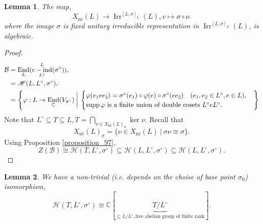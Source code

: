 \documentclass[8pt]{article}
\newtheorem{lemma}{Lemma}[section]
\DeclareMathOperator{\cind}{c-ind}
\DeclareMathOperator{\End}{End}
\DeclareMathOperator{\supp}{supp}
\DeclareMathOperator{\Irr}{Irr}
\DeclareMathOperator{\nr}{nr}
\newcommand{\C}[0]{\mathbb{C}}
\newcommand{\sep}[0]{\:|\:}
\newcommand{\hecke}[0]{\mathscr{H}}
\newcommand{\cB}{\mathcal{B}}
\begin{document}
\begin{lemma}
  \label{lemma_108}
  The map,
  \begin{equation*}
    X_{\nr}(L)\to\Irr^{[L,\sigma]_L}(L), v\mapsto \sigma\circ\nu.
  \end{equation*}
  where the image $\sigma$ is fixed unitary irreducible representation in $\Irr^{[L,\sigma]_L}(L)$, is algebraic.
\end{lemma}
\begin{proof}
  \begin{align*}
    \cB & = \End_L(\cind_{L^\circ}^L(\sigma^\circ)),\\
    & = \hecke(L,L^\circ,\sigma^\circ),\\
    & = \left\{\varphi:L\to\End_\C(V_{\sigma^\circ})\:\bigg{|}\:\begin{cases}
    \varphi(e_1ee_2) = \sigma^\circ(e_1)\circ\varphi(e)\circ\sigma^\circ(ee_2)\quad (e_1,e_2\in L^\circ,e\in L),\\
    \supp\varphi\text{ is a finite union of double cosets $L^\circ eL^\circ$}.
    \end{cases}\right\}
  \end{align*}
  Note that $L^\circ\subseteq T\subseteq L,T=\bigcap_{\nu\in X_{\nr}(L)_\sigma}\ker\nu$. Recall that 
  \begin{equation*}
    X_{\nr}(L)_\sigma = \{\nu\in X_{\nr}(L)\sep \sigma\nu\cong \sigma\}.
  \end{equation*}
  Using Proposition \ref{proposition_97},
  \begin{equation*}
    Z(\cB) \cong\hecke(T,L^\circ,\sigma^\circ)\subseteq\hecke(L,L^\circ,\sigma^\circ)\subseteq\hecke(L,L^\circ,\sigma^\circ).
  \end{equation*}
\end{proof}

\begin{lemma}
  We have a non-trivial (i.e. depends on the choise of base point $\sigma_0$) isomorphism,
  \begin{equation*}
    \hecke(T,L^\circ,\sigma^\circ) \cong\C[\underbrace{T/L^\circ}_{\subseteq L/L^\circ, \text{free abelian group of finite rank}}].
  \end{equation*}
  \label{lemma_110}
\end{lemma}
\end{document}
